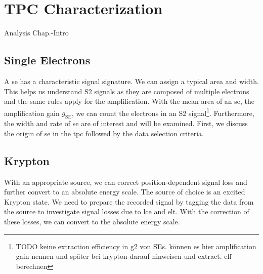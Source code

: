 \FloatBarrier
\chapter{TPC Characterization}
\label{chap:Analysis}
\FloatBarrier

Analysis Chap.-Intro

\FloatBarrier
\section{Single Electrons}
\label{sec:SE}
\FloatBarrier

A \gls{se} has a characteristic signal signature.
We can assign a typical area and width.
This helps us understand S2 signals as they are composed of multiple electrons and the same rules apply for the amplification.
With the mean area of an \gls{se}, the amplification gain $ g_\mathrm{SE} $, we can count the electrons in an S2 signal\footnote{TODO keine extraction efficiency in g2 von SEs. können es hier amplification gain nennen und später bei krypton darauf hinweisen und extract. eff berechnen}.
Furthermore, the width and rate of \gls{se} are of interest and will be examined.
First, we discuss the origin of \gls{se} in the \gls{tpc} followed by the data selection criteria.



\newpage

\newpage

\newpage

\newpage

\newpage

\FloatBarrier
\section{Krypton}
\label{sec:Kr}
\FloatBarrier

With an appropriate source, we can correct position-dependent signal loss and further convert to an absolute energy scale.
The source of choice is an excited Krypton state.
We need to prepare the recorded signal by tagging the data from the source to investigate signal losses due to \gls{lce} and \gls{elt}.
With the correction of these losses, we can convert to the absolute energy scale.



\newpage

\newpage

\newpage

\newpage

\newpage

\newpage

\newpage

\newpage
\FloatBarrier
